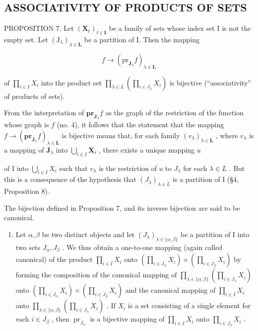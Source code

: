 \subsection{ASSOCIATIVITY OF PRODUCTS OF SETS}

PROPOSITION 7. Let \((\mathbf{X}_t)_{t \in \mathbf{I}}\) be a family of sets whose index set I is not the empty set. Let \((\mathrm{J}_{\lambda})_{\lambda \in \mathbf{L}}\) be a partition of I. Then the mapping

\[
f \rightarrow (\mathrm{pr} _ {\mathbf {J} _ {\lambda}} f) _ {\lambda \in \mathbf {L}}
\]

of \(\prod_{i\in I}X_i\) into the product set \(\prod_{\lambda \in L}\left(\prod_{i\in J_\lambda}X_i\right)\) is bijective (``associativity'' of products of sets).

From the interpretation of \(\mathbf{pr}_{\mathbf{J}_{\lambda}}f\) as the graph of the restriction of the function whose graph is \(f\) (no. 4), it follows that the statement that the mapping \(f \to (\mathbf{pr}_{\mathbf{J}_{\lambda}}f)_{\lambda \in \mathbf{L}}\) is bijective means that, for each family \((v_{\lambda})_{\lambda \in \mathbf{L}}\) , where \(v_{\lambda}\) is a mapping of \(\mathbf{J}_{\lambda}\) into \(\bigcup_{i\in I}\mathbf{X}_i\) , there exists a unique mapping \(u\)

of I into \(\bigcup_{i\in I}X_i\) such that \(v_{\lambda}\) is the restriction of \(u\) to \(J_{\lambda}\) for each \(\lambda\in L\) . But this is a consequence of the hypothesis that \((J_{\lambda})_{\lambda\in L}\) is a partition of I (§4, Proposition 8).

The bijection defined in Proposition 7, and its inverse bijection are said to be canonical.


\begin{enumerate}
\def\labelenumi{(\arabic{enumi})}
\tightlist
\item
  Let \(\alpha, \beta\) be two distinct objects and let \((J_{\lambda})_{\lambda \in \{\alpha, \beta\}}\) be a partition of I into two sets \(J_{\alpha}, J_{\beta}\) . We thus obtain a one-to-one mapping (again called canonical) of the product \(\prod_{i \in I} X_i\) onto \(\left(\prod_{i \in J_{\alpha}} X_i\right) \times \left(\prod_{i \in J_{\beta}} X_i\right)\) by forming the composition of the canonical mapping of \(\prod_{\lambda \in \{\alpha, \beta\}} \left(\prod_{i \in J_{\lambda}} X_i\right)\) onto \(\left(\prod_{i \in J_{\alpha}} X_i\right) \times \left(\prod_{i \in J_{\beta}} X_i\right)\) and the canonical mapping of \(\prod_{i \in I} X_i\) onto \(\prod_{\lambda \in \{\alpha, \beta\}} \left(\prod_{i \in J_{\lambda}} X_i\right)\) . If \(X_i\) is a set consisting of a single element for each \(i \in J_{\beta}\) , then \(\operatorname{pr}_{J_{\alpha}}\) is a bijective mapping of \(\prod_{i \in I} X_i\) onto \(\prod_{i \in J_{\beta}} X_i\) .
\end{enumerate}

